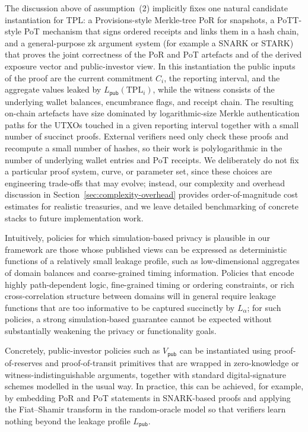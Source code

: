 \documentclass[11pt]{article}
\begin{document}
The discussion above of assumption~(2) implicitly fixes one natural candidate instantiation for TPL: a Provisions-style Merkle-tree PoR for snapshots, a PoTT-style PoT mechanism that signs ordered receipts and links them in a hash chain, and a general-purpose zk argument system (for example a SNARK or STARK) that proves the joint correctness of the PoR and PoT artefacts and of the derived exposure vector and public-investor view.
In this instantiation the public inputs of the proof are the current commitment $C_i$, the reporting interval, and the aggregate values leaked by $L_{\mathsf{pub}}(\mathrm{TPL}_i)$, while the witness consists of the underlying wallet balances, encumbrance flags, and receipt chain.
The resulting on-chain artefacts have size dominated by logarithmic-size Merkle authentication paths for the UTXOs touched in a given reporting interval together with a small number of succinct proofs.
External verifiers need only check these proofs and recompute a small number of hashes, so their work is polylogarithmic in the number of underlying wallet entries and PoT receipts.
We deliberately do not fix a particular proof system, curve, or parameter set, since these choices are engineering trade-offs that may evolve; instead, our complexity and overhead discussion in Section~\ref{sec:complexity-overhead} provides order-of-magnitude cost estimates for realistic treasuries, and we leave detailed benchmarking of concrete stacks to future implementation work.

Intuitively, policies for which simulation-based privacy is plausible in our framework are those whose published views can be expressed as deterministic functions of a relatively small leakage profile, such as low-dimensional aggregates of domain balances and coarse-grained timing information.
Policies that encode highly path-dependent logic, fine-grained timing or ordering constraints, or rich cross-correlation structure between domains will in general require leakage functions that are too informative to be captured succinctly by $L_\alpha$; for such policies, a strong simulation-based guarantee cannot be expected without substantially weakening the privacy or functionality goals.

Concretely, public-investor policies such as $V_{\mathsf{pub}}$ can be instantiated using proof-of-reserves and proof-of-transit primitives that are wrapped in zero-knowledge or witness-indistinguishable arguments, together with standard digital-signature schemes modelled in the usual way. In practice, this can be achieved, for example, by embedding PoR and PoT statements in SNARK-based proofs and applying the Fiat--Shamir transform in the random-oracle model so that verifiers learn nothing beyond the leakage profile $L_{\mathsf{pub}}$.
\end{document}

